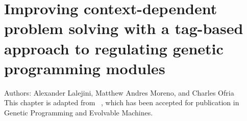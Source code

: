 \chapter{Improving context-dependent problem solving with a tag-based approach to regulating genetic programming modules}



\noindent
Authors: Alexander Lalejini, Matthew Andres Moreno, and Charles Ofria \\
This chapter is adapted from ~\citep{lalejini2020tagbased}, which has been accepted for publication in Genetic Programming and Evolvable Machines.







